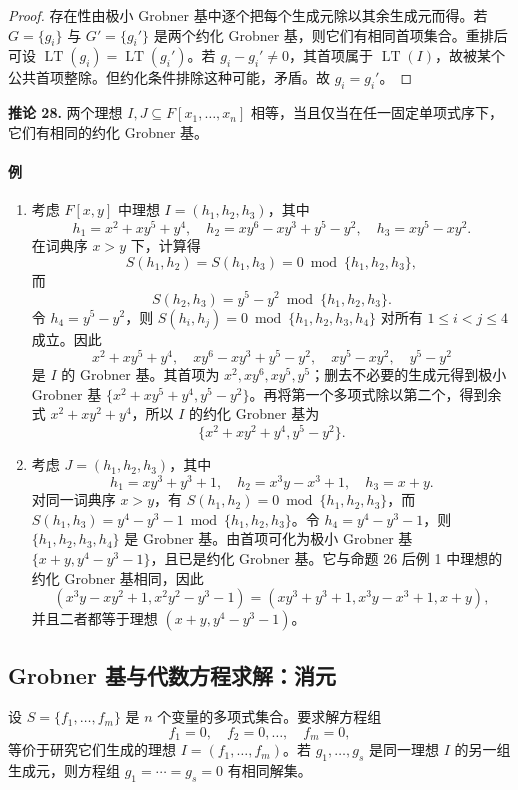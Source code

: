 \begin{proof}
	存在性由极小 Grobner 基中逐个把每个生成元除以其余生成元而得。若 $G=\{g_i\}$ 与 $G'=\{g_i'\}$ 是两个约化 Grobner 基，则它们有相同首项集合。重排后可设 $\operatorname{LT}(g_i)=\operatorname{LT}(g_i')$。若 $g_i-g_i'\neq0$，其首项属于 $\operatorname{LT}(I)$，故被某个公共首项整除。但约化条件排除这种可能，矛盾。故 $g_i=g_i'$。
\end{proof}

\noindent\textbf{推论 28.} 两个理想 $I,J\subseteq F[x_1,\ldots,x_n]$ 相等，当且仅当在任一固定单项式序下，它们有相同的约化 Grobner 基。

\paragraph{例}
\begin{enumerate}[label=(\arabic*)]
	\item 考虑 $F[x,y]$ 中理想 $I=(h_1,h_2,h_3)$，其中
\[
h_1=x^2+xy^5+y^4,
\quad h_2=xy^6-xy^3+y^5-y^2,
\quad h_3=xy^5-xy^2.
\]
在词典序 $x>y$ 下，计算得
\[
S(h_1,h_2)=S(h_1,h_3)=0\bmod\{h_1,h_2,h_3\},
\]
而
\[
S(h_2,h_3)=y^5-y^2\bmod\{h_1,h_2,h_3\}.
\]
令 $h_4=y^5-y^2$，则 $S(h_i,h_j)=0\bmod\{h_1,h_2,h_3,h_4\}$ 对所有 $1\leq i<j\leq4$ 成立。因此
\[
x^2+xy^5+y^4,
\quad xy^6-xy^3+y^5-y^2,
\quad xy^5-xy^2,
\quad y^5-y^2
\]
是 $I$ 的 Grobner 基。其首项为 $x^2,xy^6,xy^5,y^5$；删去不必要的生成元得到极小 Grobner 基 $\{x^2+xy^5+y^4,
 y^5-y^2\}$。再将第一个多项式除以第二个，得到余式 $x^2+xy^2+y^4$，所以 $I$ 的约化 Grobner 基为
\[
\{x^2+xy^2+y^4,
 y^5-y^2\}.
\]
	\item 考虑 $J=(h_1,h_2,h_3)$，其中
\[
h_1=xy^3+y^3+1,
\quad h_2=x^3y-x^3+1,
\quad h_3=x+y.
\]
对同一词典序 $x>y$，有 $S(h_1,h_2)=0\bmod\{h_1,h_2,h_3\}$，而 $S(h_1,h_3)=y^4-y^3-1\bmod\{h_1,h_2,h_3\}$。令 $h_4=y^4-y^3-1$，则 $\{h_1,h_2,h_3,h_4\}$ 是 Grobner 基。由首项可化为极小 Grobner 基 $\{x+y,
 y^4-y^3-1\}$，且已是约化 Grobner 基。它与命题 26 后例 1 中理想的约化 Grobner 基相同，因此
\[
(x^3y-xy^2+1,
 x^2y^2-y^3-1)
=(xy^3+y^3+1,
 x^3y-x^3+1,
 x+y),
\]
并且二者都等于理想 $(x+y,
 y^4-y^3-1)$。
\end{enumerate}

\subsection*{Grobner 基与代数方程求解：消元}
设 $S=\{f_1,\ldots,f_m\}$ 是 $n$ 个变量的多项式集合。要求解方程组
\[
f_1=0,
\quad f_2=0,
\ldots,
\quad f_m=0,
\]
等价于研究它们生成的理想 $I=(f_1,\ldots,f_m)$。若 $g_1,\ldots,g_s$ 是同一理想 $I$ 的另一组生成元，则方程组 $g_1=\cdots=g_s=0$ 有相同解集。

